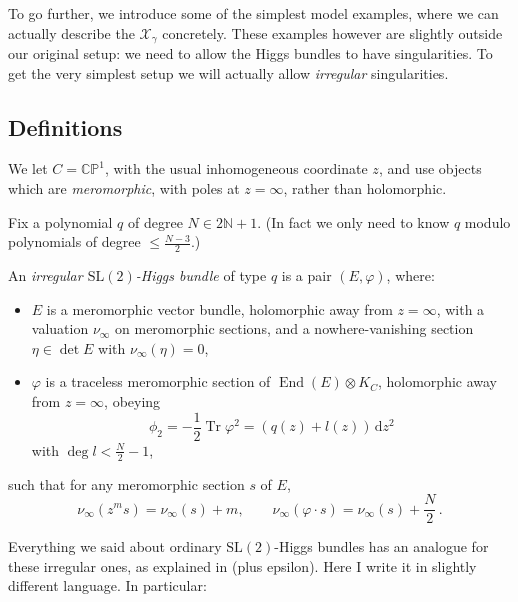 \documentclass[12pt,letterpaper,reqno]{article}
\numberwithin{equation}{section}
\begin{document}
To go further, we introduce some of the simplest model examples,
where we can actually describe the $\mathcal X_\gamma$ concretely. These examples
however are slightly outside our original setup: we need to allow
the Higgs bundles to have singularities. To get the very simplest
setup we will actually allow \textit{irregular} singularities.

\subsection{Definitions}

We let $C = \mathbb C\mathbb P^1$, with the usual inhomogeneous coordinate $z$, 
and use objects which are \textit{meromorphic},
with poles at $z = \infty$, rather than holomorphic.

Fix a polynomial $q$ of degree $N \in 2 \mathbb N + 1$.
(In fact we only need to know $q$ modulo polynomials of degree
$\le \frac{N-3}{2}$.)

\begin{defn}
An \textit{irregular $\mathrm{SL}(2)$-Higgs bundle} of type $q$ is
a pair $(E,\varphi)$, where:
\begin{itemize} 
  \item $E$ is a 
meromorphic vector bundle, holomorphic away from 
$z = \infty$, 
with a valuation $\nu_\infty$ on meromorphic sections,
and a nowhere-vanishing section $\eta \in \det E$ with $\nu_\infty(\eta) = 0$,
 \item $\varphi$ is a traceless meromorphic section of $\operatorname{End}(E) \otimes K_C$,
 holomorphic away from $z = \infty$, obeying 
\begin{equation} \label{eq:phi2-polynomial}
  \phi_2 = -\frac12 \operatorname{Tr} \varphi^2 = (q(z) + l(z)) \, \mathrm{d} z^2
\end{equation}
with $\deg l < \frac{N}{2} - 1$,
\end{itemize}
such that for any meromorphic section $s$ of $E$, 
\begin{equation}
\nu_\infty(z^{m} s) = \nu_\infty(s) + m, \qquad \nu_\infty(\varphi \cdot s) = \nu_\infty(s) + \frac{N}{2} \, .  
\end{equation}
\end{defn}

Everything we said about ordinary $\mathrm{SL}(2)$-Higgs bundles has an analogue for these 
irregular ones, as explained in \cite{wnh} (plus epsilon).
Here I write it in slightly different language.
In particular:
\end{document}
